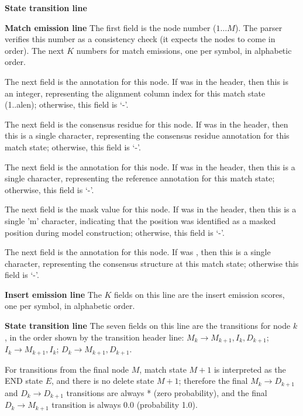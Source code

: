\begin{sreitems}{\textbf{State transition line}}

\item [\textbf{Match emission line}] The first field is the node
number ($1 \ldots M$).  The parser verifies this number as a
consistency check (it expects the nodes to come in order). The next
$K$ numbers for match emissions, one per symbol, in alphabetic order.

The next field is the  annotation for this node.  If
 was  in the header, then this is an integer,
representing the alignment column index for this match state
(1..alen); otherwise, this field is `-'.

The next field is the  consensus residue for this node.  If
 was  in the header, then this is a single
character, representing the consensus residue annotation for this
match state; otherwise, this field is `-'.

The next field is the  annotation for this node.  If
 was  in the header, then this is a single
character, representing the reference annotation for this match state;
otherwise, this field is `-'.

The next field is the  mask value for this node.  If
 was  in the header, then this is a single 'm'
character, indicating that the position was identified as a masked 
position during model construction; otherwise, this field is `-'.

The next field is the  annotation for this node.  If
 was , then this is a single character,
representing the consensus structure at this match state; otherwise
this field is `-'.

\item [\textbf{Insert emission line}] The $K$ fields on this line are
the insert emission scores, one per symbol, in alphabetic order.

\item [\textbf{State transition line}] The seven fields on this line
are the transitions for node $k$, in the order shown by the transition
header line: $M_k \rightarrow M_{k+1}, I_{k}, D_{k+1}$; $ I_k
\rightarrow M_{k+1}, I_k$; $D_{k} \rightarrow M_{k+1}, D_{k+1}$.

For transitions from the final node $M$, match state $M+1$ is
interpreted as the END state $E$, and there is no delete state $M+1$;
therefore the final $M_k \rightarrow D_{k+1}$ and $D_k \rightarrow
D_{k+1}$ transitions are always * (zero probability), and the final
$D_k \rightarrow M_{k+1}$ transition is always 0.0 (probability 1.0).
\end{sreitems}

